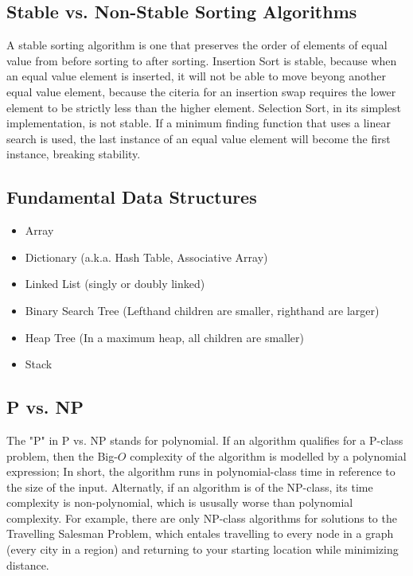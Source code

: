 \documentclass[12pt]{article}
\begin{document}
	\subsection{Stable vs. Non-Stable Sorting Algorithms}
	A stable sorting algorithm is one that preserves the order of elements of equal value from before sorting to after sorting. Insertion Sort is stable, because when an equal value element is inserted, it will not be able to move beyong another equal value element, because the citeria for an insertion swap requires the lower element to be strictly less than the higher element. Selection Sort, in its simplest implementation, is not stable. If a minimum finding function that uses a linear search is used, the last instance of an equal value element will become the first instance, breaking stability.

	\subsection{Fundamental Data Structures}
	\begin{itemize}
		\item Array
		\item Dictionary (a.k.a. Hash Table, Associative Array)
		\item Linked List (singly or doubly linked)
		\item Binary Search Tree (Lefthand children are smaller, righthand are larger)
		\item Heap Tree (In a maximum heap, all children are smaller)
		\item Stack
	\end{itemize}

	\subsection{P vs. NP}
	The "P" in P vs. NP stands for polynomial. If an algorithm qualifies for a P-class problem, then the Big-$O$ complexity of the algorithm is modelled by a polynomial expression; In short, the algorithm runs in polynomial-class time in reference to the size of the input. Alternatly, if an algorithm is of the NP-class, its time complexity is non-polynomial, which is ususally worse than polynomial complexity. For example, there are only NP-class algorithms for solutions to the Travelling Salesman Problem, which entales travelling to every node in a graph (every city in a region) and returning to your starting location while minimizing distance.
\end{document}
